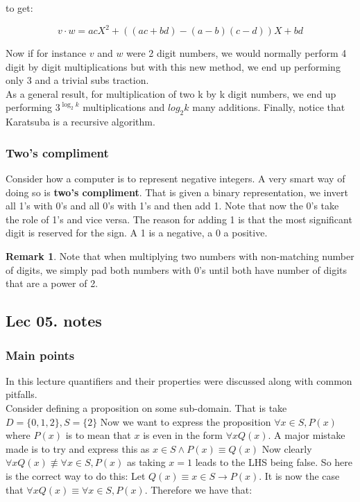 \documentclass{article}
\theoremstyle{definition}
\newtheorem{remark}{Remark}
\numberwithin{equation}{subsection}
\numberwithin{remark}{subsection}
\begin{document}
to get:

\begin{equation*}
    v\cdot w = acX^2 + ((ac + bd) - (a - b)(c - d))X + bd
\end{equation*}

Now if for instance $v$ and $w$ were 2 digit numbers, we would normally perform 4 digit by digit multiplications but with this new method, we end up performing only 3 and a trivial subs traction. 
\\
As a general result, for multiplication of two k by k digit numbers, we end up performing $3^{\log_{2}k}$ multiplications and $log_{2}k$ many additions. Finally, notice that Karatsuba is a recursive algorithm. 
\subsubsection{Two's compliment}
Consider how a computer is to represent negative integers. A very smart way of doing so is \textbf{two's compliment}. That is given a binary representation, we invert all 1's with 0's and all 0's with 1's and then add 1. Note that now the 0's take the role of 1's and vice versa. The reason for adding 1 is that the most significant digit is reserved for the sign. A 1 is a negative, a 0 a positive.  
\\
\begin{remark}
Note that when multiplying two numbers with non-matching number of digits, we simply pad both numbers with 0's until both have number of digits that are a power of 2. 
\end{remark}

\subsection{Lec 05. notes}
\subsubsection{Main points}
In this lecture quantifiers and their properties were discussed along with common pitfalls. 
\\
Consider defining a proposition on some sub-domain. That is take $D = \{0,1,2\}, S = \{2\}$ Now we want to express the proposition $\forall x \in S, P(x)$ where $P(x)$ is to mean that $x$ is even in the form $\forall x Q(x)$. A major mistake made is to try and express this as $x \in S \land P(x) \equiv Q(x)$ Now clearly $\forall x Q(x) \not \equiv \forall x \in S, P(x) $ as taking $x=1$ leads to the LHS being false. So here is the correct way to do this: Let $Q(x) \equiv x\in S \rightarrow P(x)$. It is now the case that $\forall x Q(x) \equiv \forall x \in S, P(x)$. Therefore we have that:
\end{document}
